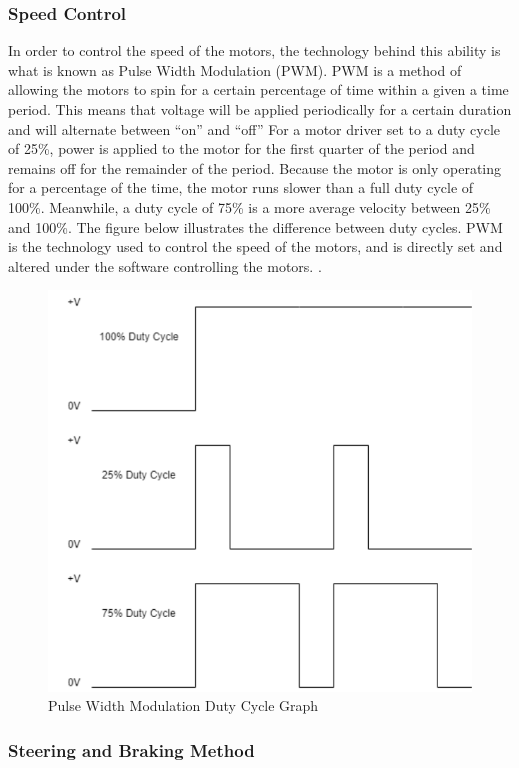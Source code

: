 \subsubsection{Speed Control}
\noindent In order to control the speed of the motors, the technology behind this ability is what is known as Pulse Width Modulation (PWM). PWM is a method of allowing the motors to spin for a certain percentage of time within a given a time period. This means that voltage will be applied periodically for a certain duration and will alternate between “on” and “off” For a motor driver set to a duty cycle of 25\%, power is applied to the motor for the first quarter of the period and remains off for the remainder of the period. Because the motor is only operating for a percentage of the time, the motor runs slower than a full duty cycle of 100\%. Meanwhile, a duty cycle of 75\% is a more average velocity between 25\% and 100\%. The figure below illustrates the difference between duty cycles. PWM is the technology used to control the speed of the motors, and is directly set and altered under the software controlling the motors. \cite{etechsparks}. \\

\begin{figure}[H]
	\centering
	\includegraphics[width=.85\textwidth]{./Images/pwm.png}
	\caption{\label{fig:pwm}Pulse Width Modulation Duty Cycle Graph}
\end{figure}


\subsubsection{Steering and Braking Method }
\noindent 

